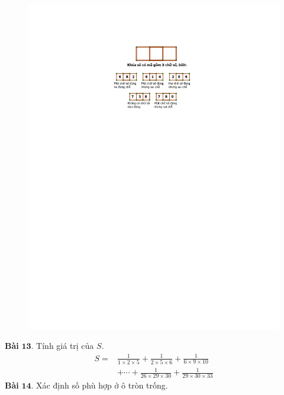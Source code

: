 \begin{multicols}{2}
\begin{figure}[H]
		\includegraphics[width= 1\linewidth]{bai12}
		\vspace*{-15pt}
	\end{figure}
	\textbf{\color{toancuabi}Bài} $\pmb{13.}$ Tính giá trị của $S$.
	\begin{align*}
		S =& \frac{1}{1\times 2 \times 5} + \frac{1}{2\times 5 \times 6} + \frac{1}{6\times9\times 10} \\
		&+ \cdots + \frac{1}{26 \times 29 \times 30} + \frac{1}{29\times 30 \times 33}
	\end{align*}
	\textbf{\color{toancuabi}Bài} $\pmb{14.}$  Xác định số phù hợp ở ô tròn trống.
	\begin{figure}[H]
		\vspace*{-5pt}
		\centering
		\captionsetup{labelformat= empty, justification=centering}

\end{figure}
\end{multicols}

